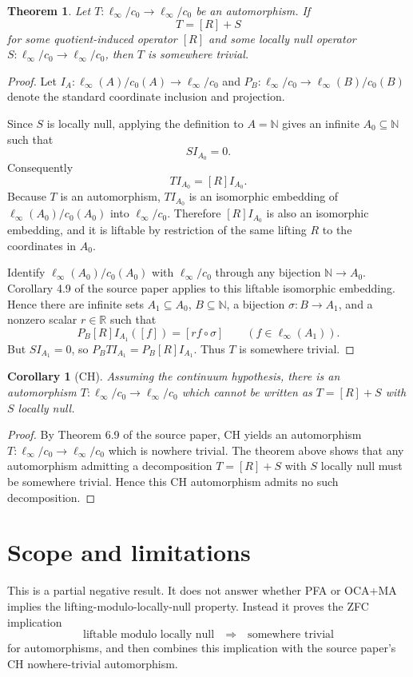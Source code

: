 \documentclass[11pt]{article}
\newtheorem{theorem}{Theorem}
\newtheorem{corollary}{Corollary}
\newcommand{\N}{\mathbb N}
\newcommand{\R}{\mathbb R}
\newcommand{\X}{\ell_\infty/c_0}
\begin{document}
\begin{theorem}
Let \(T:\X\to\X\) be an automorphism.  If
\[
T=[R]+S
\]
for some quotient-induced operator \([R]\) and some locally null operator
\(S:\X\to\X\), then \(T\) is somewhere trivial.
\end{theorem}

\begin{proof}
Let \(I_A:\ell_\infty(A)/c_0(A)\to\X\) and
\(P_B:\X\to\ell_\infty(B)/c_0(B)\) denote the standard coordinate inclusion
and projection.

Since \(S\) is locally null, applying the definition to \(A=\N\) gives an
infinite \(A_0\subseteq\N\) such that
\[
S I_{A_0}=0.
\]
Consequently
\[
T I_{A_0}=[R]I_{A_0}.
\]
Because \(T\) is an automorphism, \(T I_{A_0}\) is an isomorphic embedding of
\(\ell_\infty(A_0)/c_0(A_0)\) into \(\X\).  Therefore \([R]I_{A_0}\) is also
an isomorphic embedding, and it is liftable by restriction of the same lifting
\(R\) to the coordinates in \(A_0\).

Identify \(\ell_\infty(A_0)/c_0(A_0)\) with \(\X\) through any bijection
\(\N\to A_0\).  Corollary 4.9 of the source paper applies to this liftable
isomorphic embedding.  Hence there are infinite sets
\(A_1\subseteq A_0\), \(B\subseteq\N\), a bijection \(\sigma:B\to A_1\), and
a nonzero scalar \(r\in\R\) such that
\[
P_B [R] I_{A_1}([f])=[r f\circ\sigma]
\qquad (f\in\ell_\infty(A_1)).
\]
But \(S I_{A_1}=0\), so \(P_B T I_{A_1}=P_B[R]I_{A_1}\).  Thus \(T\) is
somewhere trivial.
\end{proof}

\begin{corollary}[CH]
Assuming the continuum hypothesis, there is an automorphism
\(T:\X\to\X\) which cannot be written as \(T=[R]+S\) with \(S\) locally null.
\end{corollary}

\begin{proof}
By Theorem 6.9 of the source paper, CH yields an automorphism \(T:\X\to\X\)
which is nowhere trivial.  The theorem above shows that any automorphism
admitting a decomposition \(T=[R]+S\) with \(S\) locally null must be somewhere
trivial.  Hence this CH automorphism admits no such decomposition.
\end{proof}

\section*{Scope and limitations}

This is a partial negative result.  It does not answer whether PFA or OCA+MA
implies the lifting-modulo-locally-null property.  Instead it proves the ZFC
implication
\[
\text{liftable modulo locally null} \quad\Longrightarrow\quad
\text{somewhere trivial}
\]
for automorphisms, and then combines this implication with the source paper's
CH nowhere-trivial automorphism.
\end{document}
